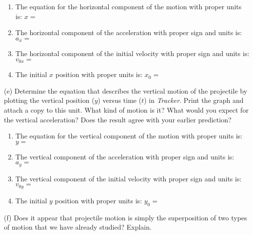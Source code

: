 \begin{enumerate}
\item The equation for the horizontal component of the motion with proper units is:
$x =$\vspace{5mm}

\item The horizontal component of the acceleration with proper sign and units is:
\( a_{x}= \) \vspace{5mm}

\item The horizontal component of the initial velocity with proper sign and units
is: \( v_{0x}= \)\vspace{5mm}

\item The initial $x$ position with proper units is: \( x_{0}= \)\vspace{5mm}

\end{enumerate}
(e) Determine the equation that describes the vertical motion of the projectile
by plotting the vertical position ($y$) versus time ($t$) in \textit{Tracker}. 
Print the graph and attach a copy to this unit. 
What kind of motion is it? What would you expect for the vertical acceleration? Does the result agree with your earlier prediction?
\vspace{15mm}

\begin{enumerate}
\item The equation for the vertical component of the motion with proper units is:
$y =$\vspace{5mm}

\item The vertical component of the acceleration with proper sign and units is: 
\( a_{y}= \)
\vspace{5mm}

\item The vertical component of the initial velocity with proper sign and units is:
\( v_{0y}= \) \vspace{5mm}

\item The initial $y$ position with proper units is: \( y_{0} =\) \vspace{5mm}

\end{enumerate}
(f) Does it appear that projectile motion is simply the superposition of two
types of motion that we have already studied? Explain.
\vspace{20mm}

